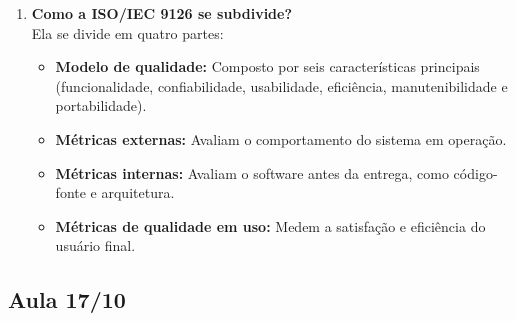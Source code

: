 \documentclass[12pt]{article}
\begin{document}
\begin{enumerate}[label=\textbf{\arabic*.}]
  \item \textbf{Como a \textsc{ISO/IEC} 9126 se subdivide?} \\
    Ela se divide em quatro partes:
    \begin{itemize}
      \item \textbf{Modelo de qualidade:} Composto por seis características principais (funcionalidade, confiabilidade, usabilidade, eficiência, manutenibilidade e portabilidade). 
      \item \textbf{Métricas externas:} Avaliam o comportamento do sistema em operação.
      \item \textbf{Métricas internas:} Avaliam o software antes da entrega, como código-fonte e arquitetura.
      \item \textbf{Métricas de qualidade em uso:} Medem a satisfação e eficiência do usuário final.
    \end{itemize}
\end{enumerate}

\subsection*{Aula 17/10}
\end{document}
